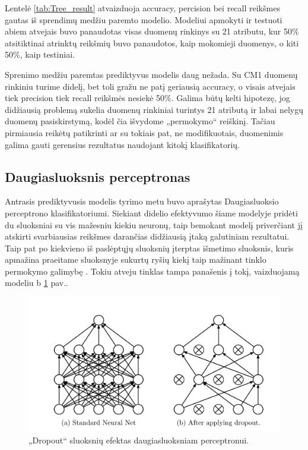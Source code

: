 \documentclass{VUMIFPSbakalaurinis}
\begin{document}
Lentelė \ref{tab:Tree_result} atvaizduoja accuracy, percision bei recall reikšmes gautas iš sprendimų medžiu paremto modelio. Modeliui apmokyti ir testuoti abiem atvejais buvo panaudotas visas duomenų rinkinys su 21 atributu, kur 50\% atsitiktinai atrinktų reikšmių buvo panaudotos, kaip mokomieji duomenys, o kiti 50\%, kaip testiniai.

Sprenimo medžiu paremtas prediktyvus modelis daug nežada. Su CM1 duomenų rinkiniu turime didelį, bet toli gražu ne patį geriausią accuracy, o visais atvejais tiek precision tiek recall reikšmės nesiekė 50\%. Galima būtų kelti hipotezę, jog didžiausią problemą sukelia duomenų rinkiniai turintys 21 atributą ir labai nelygų duomenų pasiskirstymą, kodėl čia išvydome „permokymo“ reiškinį. Tačiau pirmiausia reikėtų patikrinti ar su tokiais pat, ne modifikuotais, duomenimis galima gauti gerensius rezultatus naudojant kitokį klasifikatorių.

\subsection{Daugiasluoksnis perceptronas}
Antrasis prediktyvusis modelis tyrimo metu buvo aprašytas Daugiasluoksio perceptrono klasifikatoriumi. Siekiant didelio efektyvumo šiame modelyje pridėti du sluoksniai su vis mažesniu kiekiu neuronų, taip bemokant modelį priverčiant jį atskirti svarbiausias reikšmes darančias didžiausią įtaką galutiniam rezultatui. Taip pat po kiekvieno iš paslėptųjų sluoksnių įterptas išmetimo sluoksnis, kuris apmažina praeitame sluoksnyje sukurtų ryšių kiekį taip mažinant tinklo permokymo galimybę \cite{JMLR:v15:srivastava14a}. Tokiu atveju tinklas tampa panašenis į tokį, vaizduojamą modeliu b \ref{img:dropout} pav..

\begin{figure}[H]
    \centering
    \includegraphics[scale=0.5]{img/dropout}
    \caption{„Dropout“ sluoksnių efektas daugiasluoksniam perceptronui.}
    \label{img:dropout}
\end{figure}
\end{document}
